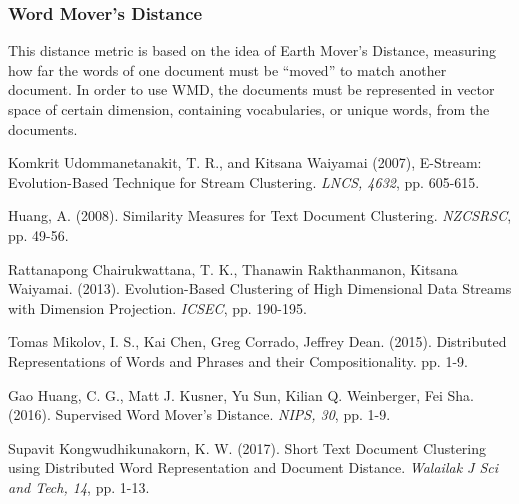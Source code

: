 \documentclass{IEEEtran}
\begin{document}
\subsubsection{Word Mover's Distance}
This distance metric is based on the idea of Earth Mover's Distance, measuring how far the words of one document must be ``moved'' to match another document. In order to use WMD, the documents must be represented in vector space of certain dimension, containing vocabularies, or unique words, from the documents.

\begin{thebibliography}{99}
 Komkrit Udommanetanakit, T. R., and Kitsana Waiyamai (2007), E-Stream: Evolution-Based Technique for Stream Clustering. {\it  LNCS, 4632},  pp. 605-615.

 Huang, A. (2008). Similarity Measures for Text Document Clustering. {\it NZCSRSC}, pp. 49-56. 
 
 Rattanapong Chairukwattana, T. K., Thanawin Rakthanmanon, Kitsana Waiyamai. (2013). Evolution-Based Clustering of High Dimensional Data Streams with Dimension Projection. {\it ICSEC}, pp. 190-195. 
  
 Tomas Mikolov, I. S., Kai Chen, Greg Corrado, Jeffrey Dean. (2015). Distributed Representations of Words and Phrases and their Compositionality. pp. 1-9.
  
 Gao Huang, C. G., Matt J. Kusner, Yu Sun, Kilian Q. Weinberger, Fei Sha. (2016). Supervised Word Mover's Distance. {\it NIPS, 30}, pp. 1-9. 
  
 Supavit Kongwudhikunakorn, K. W. (2017). Short Text Document Clustering using Distributed Word Representation and Document Distance. {\it  Walailak J Sci and Tech, 14}, pp. 1-13. 
    
\end{thebibliography}
\end{document}
